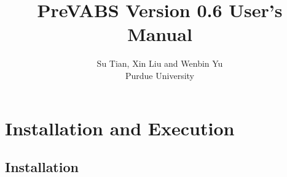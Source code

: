 \documentclass{book}
\begin{document}
\title{PreVABS Version 0.6 User's Manual}
\author{Su Tian, Xin Liu and Wenbin Yu\\ Purdue University}
\maketitle
\tableofcontents


\chapter{Installation and Execution}

\section{Installation}
\label{sec:install}
\end{document}
